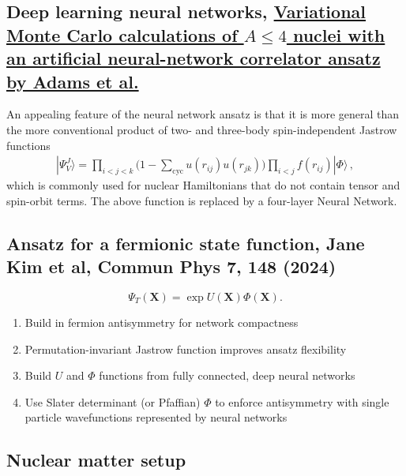 \documentclass[%
oneside,                 %
final,                   %
10pt]{article}
\begin{document}
\subsection{Deep learning neural networks, \href{{https://journals.aps.org/prl/abstract/10.1103/PhysRevLett.127.022502}}{Variational Monte Carlo calculations of $A\le 4$ nuclei with an artificial neural-network correlator ansatz by Adams et al.}}

An appealing feature of the neural network ansatz is that it is more general than the more conventional product of two-
and three-body spin-independent Jastrow functions
\begin{align}
|\Psi_V^J \rangle = \prod_{i<j<k} \Big( 1-\sum_{\text{cyc}} u(r_{ij}) u(r_{jk})\Big) \prod_{i<j} f(r_{ij}) | \Phi\rangle\,,
\end{align}
which is commonly used for nuclear Hamiltonians that do not contain tensor and spin-orbit terms.
The above function is replaced by a four-layer Neural Network. 

\subsection{Ansatz for a fermionic state function, Jane Kim et al, Commun Phys 7, 148 (2024)}

\[
\Psi_T(\bm{X}) =\exp{U(\bm{X})}\Phi(\bm{X}).
\]

\begin{block}{}
\begin{enumerate}
\item Build in fermion antisymmetry for network compactness

\item Permutation-invariant Jastrow function improves ansatz flexibility

\item Build $U$ and $\Phi$ functions from fully connected, deep neural networks

\item Use Slater determinant (or Pfaffian) $\Phi$ to enforce antisymmetry with single particle wavefunctions represented by neural networks
\end{enumerate}

\noindent
\end{block}

\subsection{Nuclear matter setup}
\end{document}
